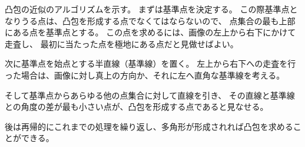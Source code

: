 \documentclass{jsarticle}
\begin{document}
\begin{multicols}{2}
凸包の近似のアルゴリズムを示す。
まずは基準点を決定する。
この際基準点となりうる点は、凸包を形成する点でなくてはならないので、
点集合の最も上部にある点を基準点とする。
この点を求めるには、画像の左上から右下にかけて走査し、
最初に当たった点を極地にある点だと見做せばよい。

次に基準点を始点とする半直線（基準線）を置く。
左上から右下への走査を行った場合は、画像に対し真上の方向か、それに左へ直角な基準線を考える。

そして基準点からあらゆる他の点集合に対して直線を引き、
その直線と基準線との角度の差が最も小さい点が、凸包を形成する点であると見なせる。

後は再帰的にこれまでの処理を繰り返し、多角形が形成されれば凸包を求めることができる。

%
%

\end{multicols}
\end{document}

